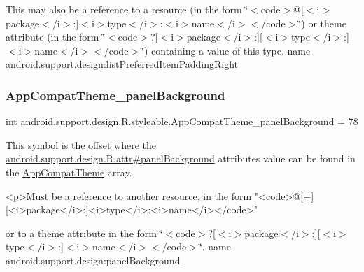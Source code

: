 This may also be a reference to a resource (in the form \char`\"{}$<$code$>$@\mbox{[}$<$i$>$package$<$/i$>$\+:\mbox{]}$<$i$>$type$<$/i$>$\+:$<$i$>$name$<$/i$>$$<$/code$>$\char`\"{}) or theme attribute (in the form \char`\"{}$<$code$>$?\mbox{[}$<$i$>$package$<$/i$>$\+:\mbox{]}\mbox{[}$<$i$>$type$<$/i$>$\+:\mbox{]}$<$i$>$name$<$/i$>$$<$/code$>$\char`\"{}) containing a value of this type.  name android.\+support.\+design\+:list\+Preferred\+Item\+Padding\+Right \mbox{\label{classandroid_1_1support_1_1design_1_1R_1_1styleable_a29b397614d1d7cf59c6c120c90e3b529}} 
\subsubsection{\texorpdfstring{App\+Compat\+Theme\+\_\+panel\+Background}{AppCompatTheme\_panelBackground}}
{\footnotesize\ttfamily int android.\+support.\+design.\+R.\+styleable.\+App\+Compat\+Theme\+\_\+panel\+Background = 78\hspace{0.3cm}{\ttfamily [static]}}

This symbol is the offset where the \hyperlink{classandroid_1_1support_1_1design_1_1R_1_1attr_ad363e0649bee876bc29776da9e7507e5}{android.\+support.\+design.\+R.\+attr\#panel\+Background} attribute\textquotesingle{}s value can be found in the \hyperlink{classandroid_1_1support_1_1design_1_1R_1_1styleable_afb351dc8de20cbd4c89abe360373010c}{App\+Compat\+Theme} array.

\begin{DoxyVerb}      <p>Must be a reference to another resource, in the form "<code>@[+][<i>package</i>:]<i>type</i>:<i>name</i></code>"
\end{DoxyVerb}
 or to a theme attribute in the form \char`\"{}$<$code$>$?\mbox{[}$<$i$>$package$<$/i$>$\+:\mbox{]}\mbox{[}$<$i$>$type$<$/i$>$\+:\mbox{]}$<$i$>$name$<$/i$>$$<$/code$>$\char`\"{}.  name android.\+support.\+design\+:panel\+Background \mbox{\label{classandroid_1_1support_1_1design_1_1R_1_1styleable_a8c51cf0e087c4190c18f5548d4dfad15}} 

